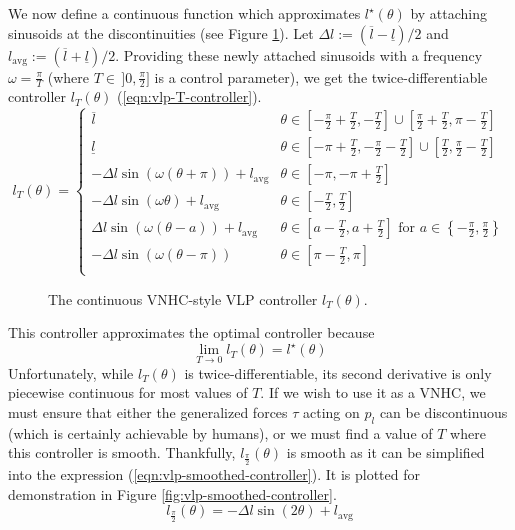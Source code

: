 We now define a continuous function which
approximates \(l^\star(\theta)\) by attaching sinusoids at the
discontinuities (see Figure \ref{fig:vlp-T-controller}). 
Let \(\Delta l := (\overline{l} - \underline{l})/2\) and 
\(l_{\text{avg}} := (\overline{l} + \underline{l})/2\).
Providing these newly attached sinusoids with a frequency \(\omega = \frac{\pi}{T}\) 
(where \(T \in \, ]0,\frac{\pi}{2}]\) is a control parameter), we get the
twice-differentiable controller \(l_T(\theta)\) (\ref{eqn:vlp-T-controller}).
\begin{equation}\label{eqn:vlp-T-controller}
   l_T(\theta) = \begin{cases}
      \overline{l} & \theta \in \left[-\frac{\pi}{2} + \frac{T}{2}, -\frac{T}{2}\right] 
      \cup \left[\frac{\pi}{2} + \frac{T}{2}, \pi - \frac{T}{2}\right] \\
      \underline{l} & \theta \in \left[-\pi + \frac{T}{2}, -\frac{\pi}{2} - \frac{T}{2}\right] 
      \cup \left[\frac{T}{2}, \frac{\pi}{2} - \frac{T}{2}\right] \\
      -\Delta l \sin(\omega(\theta + \pi)) + l_{\text{avg}} & \theta \in
      \left[-\pi,-\pi + \frac{T}{2}\right] \\
      -\Delta l \sin(\omega \theta) + l_\text{avg} & \theta \in [-\frac{T}{2},
      \frac{T}{2}] \\
      \Delta l \sin(\omega(\theta - a)) + l_\text{avg} & 
      \theta \in \left[a - \frac{T}{2}, a + \frac{T}{2}\right] \text{ for } 
      a \in \left\{-\frac{\pi}{2}, \frac{\pi}{2}\right\} \\
      -\Delta l \sin(\omega(\theta-\pi)) & \theta \in \left[\pi - \frac{T}{2},\pi\right] \\
   \end{cases}
\end{equation}

\begin{figure}
   \centering
   
   \caption{The continuous VNHC-style VLP controller \(l_T(\theta)\).}\label{fig:vlp-T-controller}
\end{figure}

This controller approximates the optimal controller because 
\[
   \lim\limits_{T \rightarrow 0} l_T(\theta) = l^\star(\theta)
\]
Unfortunately, while \(l_T(\theta)\) is twice-differentiable, its second
derivative is only piecewise continuous for most values of \(T\).
If we wish to use it as a VNHC, we must ensure that either the generalized
forces \(\tau\) acting on \(p_l\) can be discontinuous (which is certainly
achievable by humans), or we must find a value of \(T\) where this controller is
smooth.
Thankfully, \(l_{\frac{\pi}{2}}(\theta)\) is smooth as it can be simplified into
the expression (\ref{eqn:vlp-smoothed-controller}). 
It is plotted for demonstration in Figure \ref{fig:vlp-smoothed-controller}.
\begin{equation}\label{eqn:vlp-smoothed-controller}
   l_\frac{\pi}{2}(\theta) = -\Delta l \sin(2\theta) + l_{\text{avg}}
\end{equation}

